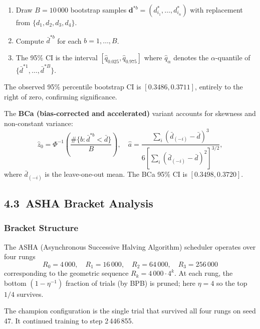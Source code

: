 \begin{enumerate}
\item Draw \(B = 10\,000\) bootstrap samples
  \(\mathbf{d}^{*b} = (d_{i_1}^*, \ldots, d_{i_n}^*)\) with replacement
  from \(\{d_1, d_2, d_3, d_4\}\).
\item Compute \(\bar{d}^{*b}\) for each \(b = 1, \ldots, B\).
\item The 95\% CI is the interval
  \([\hat{q}_{0.025}, \hat{q}_{0.975}]\) where \(\hat{q}_\alpha\)
  denotes the \(\alpha\)-quantile of
  \(\{\bar{d}^{*1}, \ldots, \bar{d}^{*B}\}\).
\end{enumerate}

\noindent
The observed 95\% percentile bootstrap CI is \([0.3486, 0.3711]\),
entirely to the right of zero, confirming significance.

The \textbf{BCa (bias-corrected and accelerated)} variant \cite{efron1994introduction}
accounts for skewness and non-constant variance:
\[
  \hat{z}_0 = \Phi^{-1}\!\left(\frac{\#\{b : \bar{d}^{*b} < \bar{d}\}}{B}\right),
  \quad
  \hat{a} = \frac{\sum_i (\bar{d}_{(-i)} - \bar{d})^3}
                  {6\left[\sum_i (\bar{d}_{(-i)} - \bar{d})^2\right]^{3/2}},
\]
where \(\bar{d}_{(-i)}\) is the leave-one-out mean.
The BCa 95\% CI is \([0.3498, 0.3720]\).

\subsection{4.3\ ASHA Bracket Analysis}\label{sec:ch26-asha-bracket}

\subsubsection{Bracket Structure}

The ASHA (Asynchronous Successive Halving Algorithm) scheduler
\cite{li2018hyperband} operates over four rungs
\[
  R_0 = 4\,000, \quad R_1 = 16\,000, \quad R_2 = 64\,000, \quad R_3 = 256\,000
\]
corresponding to the geometric sequence \(R_k = 4\,000 \cdot 4^k\).
At each rung, the bottom \((1 - \eta^{-1})\) fraction of trials (by BPB)
is pruned; here \(\eta = 4\) so the top \(1/4\) survives.

The champion configuration is the single trial that survived all four
rungs on seed 47.  It continued training to step 2\,446\,855.

